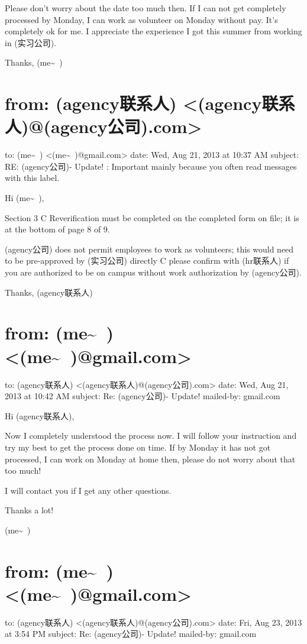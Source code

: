 \documentclass[12pt]{book}
\begin{document}
Please don't worry about the date too much then. If I can not get completely processed by Monday, I can work as volunteer on Monday without pay. It's completely ok for me. I appreciate the experience I got this summer from working in (实习公司). 

Thanks,
(me\textasciitilde{}~)


\section{from:         (agency联系人) <(agency联系人)@(agency公司).com>}
\label{sec-35-12}
to:         (me\textasciitilde{}~) <(me\textasciitilde{}~)@gmail.com>
date:         Wed, Aug 21, 2013 at 10:37 AM
subject:         RE: (agency公司)- Update!
:         Important mainly because you often read messages with this label.

Hi (me\textasciitilde{}~),

Section 3 C Reverification  must be completed on the completed form on file; it is at the bottom of page 8 of 9.

(agency公司) does not permit employees to work as volunteers; this would need to be pre-approved by (实习公司) directly C please confirm with (hr联系人) if you are authorized to be on campus without work authorization by (agency公司).

Thanks,
(agency联系人)


\section{from:         (me\textasciitilde{}~) <(me\textasciitilde{}~)@gmail.com>}
\label{sec-35-13}
to:         (agency联系人) <(agency联系人)@(agency公司).com>
date:         Wed, Aug 21, 2013 at 10:42 AM
subject:         Re: (agency公司)- Update!
mailed-by:         gmail.com

Hi (agency联系人), 

Now I completely understood the process now. I will follow your instruction and try my best to get the process done on time. 
If by Monday it has not got processed, I can work on Monday at home then, please do not worry about that too much!

I will contact you if I get any other questions. 

Thanks a lot!

(me\textasciitilde{}~)


\section{from:         (me\textasciitilde{}~) <(me\textasciitilde{}~)@gmail.com>}
\label{sec-35-14}
to:         (agency联系人) <(agency联系人)@(agency公司).com>
date:         Fri, Aug 23, 2013 at 3:54 PM
subject:         Re: (agency公司)- Update!
mailed-by:         gmail.com
\end{document}
